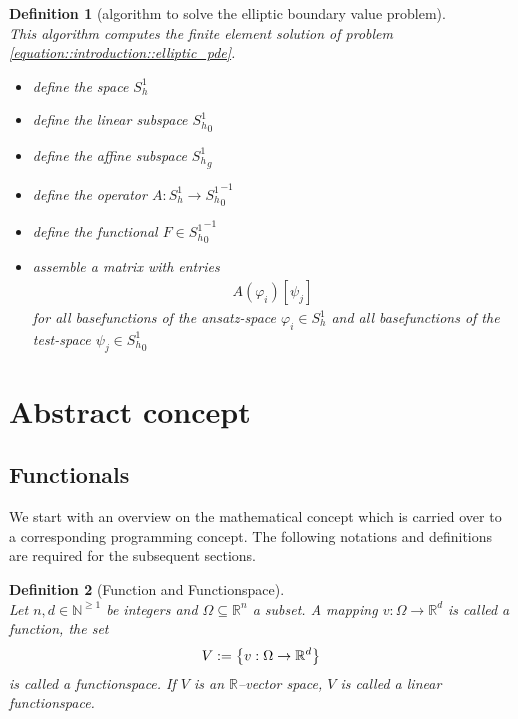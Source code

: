 \documentclass[a4paper,11pt]{article}
\numberwithin{equation}{section}
\newtheorem{definition}{Definition}[section]
\newcommand{\theoremNewline}{\hspace{1mm}\\}
\newcommand{\theoremEndLine}{\hspace{1mm}}
\newcommand{\N}{\mathbb{N}}
\newcommand{\R}{\mathbb{R}}
\begin{document}
    \begin{definition}[algorithm to solve the elliptic boundary value problem]\theoremNewline
      This algorithm computes the finite element solution of problem
      \eqref{equation::introduction::elliptic_pde}.
      \begin{itemize}
        \item[$(i)$] define the space $S_{h}^{1}$
        \item[$(ii)$] define the linear subspace ${S_{h}^{1}}_{0}$
        \item[$(iii)$] define the affine subspace ${S_{h}^{1}}_{g}$
        \item[$(iv)$] define the operator ${A: {S_{h}^{1}} \rightarrow {S_{h}^{1}}_{0}^{-1}}$
        \item[$(v)$] define the functional ${F \in {S_{h}^{1}}_{0}^{-1}}$
        \item[$(vi)$] assemble a matrix with entries
          \begin{align}
            \label{equation::introduction::matrix_entries}
            A( \varphi_{i} )[ \psi_j ]
          \end{align}
          for all basefunctions of the ansatz-space ${\varphi_i \in S_h^1}$ and all basefunctions of the test-space
          ${\psi_j \in {S_h^1}_0}$

      \end{itemize}


    \end{definition}


  \section{Abstract concept}
    \label{section::abstract_concept}

    \subsection{Functionals}

      We start with an overview on the mathematical concept which is carried over to a corresponding programming
      concept. The following notations and definitions are required for the subsequent sections.

      \begin{definition}[Function and Functionspace]\theoremNewline
        \label{definition::abstract_concept::function_functionspace}
        Let ${n,d \in \N^{\geq 1}}$ be integers and ${\Omega \subseteq \mathbb{R}^n}$ a subset. A mapping
        ${v : \Omega \rightarrow \R^d}$ is called a \textnormal{function}, the set
        \begin{align}
          V :=
            \big\{
              v : \Omega \rightarrow \R^d
            \big\}
            \notag
        \end{align}
        is called a \textnormal{functionspace}. If $V$ is an $\R$--vector space, $V$ is called a \textnormal{linear functionspace}.
      \end{definition}\theoremEndLine
\end{document}
